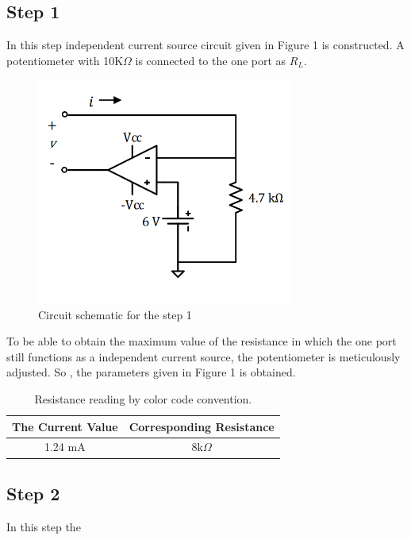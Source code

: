 \documentclass[letterpaper,12pt]{article}
\begin{document}
\subsection{Step 1}
In this step independent current source circuit given in Figure 1 is constructed. A potentiometer with 10K\(\Omega\) is connected to the one port as \(R_L\).
\begin{figure}[H]
    \centering
    \includegraphics[width = 0.75\textwidth]{1SCH.png}
    \caption{Circuit schematic for the step 1}
\end{figure} 
To be able to obtain the maximum value of the resistance in which the one port still functions as a independent current source, the potentiometer is meticulously adjusted. So , the parameters given in Figure 1 is obtained.
\begin{table}[H]
    \begin{center}
        \caption{Resistance reading by color code convention.}
        \vspace{2mm}
        \begin{tabular}{||c | c ||} 
            \hline
            The Current Value & Corresponding Resistance \\ [0.5ex] 
            \hline\hline
            1.24 mA & 8k\(\Omega\)    \\
            \hline
        \end{tabular}
    \end{center}
\end{table}

\subsection{Step 2}
In this step the 
\end{document}
